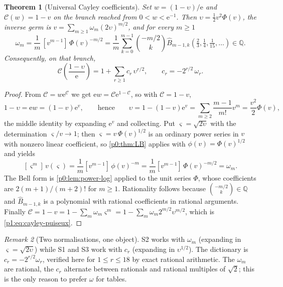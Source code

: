 \documentclass[11pt,a4paper,oneside]{book}
\theoremstyle{plain}
\newtheorem{theorem}{Theorem}[chapter]
\theoremstyle{definition}
\theoremstyle{remark}
\newtheorem{remark}[theorem]{Remark}
\newcommand{\Rat}{\mathbb{Q}}
\newcommand{\e}{\mathrm{e}}
\newcommand{\Coef}[1]{[#1]\,}
\newcommand{\OB}{\widehat{B}}
\begin{document}
\begin{theorem}[Universal Cayley coefficients]
\label{p1:thm:omega}
Set $w=(1-\upsilon)/\e$ and $\mathcal C(w)=1-v$ on the branch reached from $0<w<\e^{-1}$. Then
$\upsilon=\tfrac12v^{2}\Phi(v)$, the inverse germ is
$v=\sum_{m\ge1}\omega_m(2\upsilon)^{m/2}$, and for every $m\ge1$
\begin{equation}
 \boxed{\;\omega_m=\frac1m\,\Coef{v^{m-1}}\Phi(v)^{-m/2}
 =\frac1m\sum_{k=0}^{m-1}\binom{-m/2}{k}
 \OB_{m-1,k}\!\left(\tfrac23,\tfrac14,\tfrac1{15},\ldots\right)
 \in\Rat .\;}
 \label{p1:eq:omega-master}
\end{equation}
Consequently, on that branch,
\begin{equation}
 \mathcal C\!\left(\frac{1-\upsilon}{\e}\right)
 =1+\sum_{r\ge1}c_r\,\upsilon^{r/2},
 \qquad
 c_r=-2^{r/2}\,\omega_r .
 \label{p1:eq:cayley-puiseux}
\end{equation}
\end{theorem}

\begin{proof}
From $\mathcal C=w\e^{\mathcal C}$ we get $\e w=\mathcal C\e^{1-\mathcal C}$, so with
$\mathcal C=1-v$,
\[
1-\upsilon=\e w=(1-v)\e^{v}, \qquad\text{hence}\qquad \upsilon=1-(1-v)\e^{v}
=\sum_{m\ge2}\frac{m-1}{m!}v^{m} =\frac{v^{2}}{2}\Phi(v),
\]
the middle identity by expanding $\e^v$ and collecting.  Put $\varsigma=\sqrt{2\upsilon}$ with
the determination $\varsigma/v\to1$; then $\varsigma=v\,\Phi(v)^{1/2}$ is an ordinary power
series in $v$ with nonzero linear coefficient, so \cref{p0:thm:LB} applies with
$\phi(v)=\Phi(v)^{1/2}$ and yields
\[
\Coef{\varsigma^{m}}v(\varsigma) =\frac1m\Coef{v^{m-1}}\phi(v)^{-m}
=\frac1m\Coef{v^{m-1}}\Phi(v)^{-m/2}=\omega_m .
\]
The Bell form is \cref{p0:lem:power-log} applied to the unit series $\Phi$, whose coefficients
are $2(m+1)/(m+2)!$ for $m\ge1$.  Rationality follows because $\binom{-m/2}{k}\in\Rat$ and
$\OB_{m-1,k}$ is a polynomial with rational coefficients in rational arguments.  Finally
$\mathcal C=1-v=1-\sum_m\omega_m\varsigma^m =1-\sum_m\omega_m2^{m/2}\upsilon^{m/2}$, which is
\cref{p1:eq:cayley-puiseux}.
\end{proof}

\begin{remark}[Two normalisations, one object]
\label{p1:rem:omega-vs-c}
\textsf{S2} works with $\omega_m$ (expanding in $\varsigma=\sqrt{2\upsilon}$) while
\textsf{S1} and \textsf{S3} work with $c_r$ (expanding in $\upsilon^{1/2}$).  The dictionary
is $c_r=-2^{r/2}\omega_r$, verified here for $1\le r\le18$ by exact rational arithmetic.  The
$\omega_m$ are rational, the $c_r$ alternate between rationals and rational multiples of
$\sqrt2$; this is the only reason to prefer $\omega$ for tables.
\end{remark}
\end{document}

